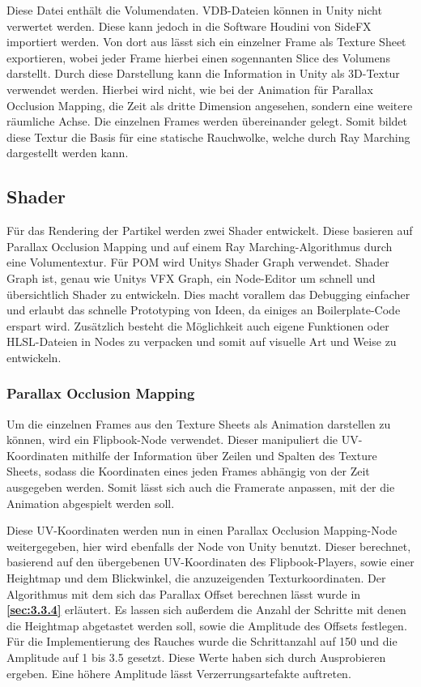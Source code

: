 Diese Datei enthält die Volumendaten. VDB-Dateien können in Unity nicht verwertet werden. Diese kann jedoch in die Software Houdini von SideFX importiert werden. 
Von dort aus lässt sich ein einzelner Frame als Texture Sheet exportieren, wobei jeder Frame hierbei einen sogennanten Slice des Volumens darstellt.
Durch diese Darstellung kann die Information in Unity als 3D-Textur verwendet werden.
Hierbei wird nicht, wie bei der Animation für Parallax Occlusion Mapping, die Zeit als dritte Dimension angesehen, sondern eine weitere räumliche Achse.
Die einzelnen Frames werden übereinander gelegt. Somit bildet diese Textur die Basis für eine statische Rauchwolke, welche durch Ray Marching dargestellt werden kann.



\subsection{Shader}
Für das Rendering der Partikel werden zwei Shader entwickelt. Diese basieren auf Parallax Occlusion Mapping und auf einem Ray Marching-Algorithmus
durch eine Volumentextur. Für POM wird Unitys Shader Graph verwendet. Shader Graph ist, genau wie Unitys VFX Graph, ein Node-Editor um
schnell und übersichtlich Shader zu entwickeln. Dies macht vorallem das Debugging einfacher und erlaubt das schnelle Prototyping von Ideen,
da einiges an Boilerplate-Code erspart wird. Zusätzlich besteht die Möglichkeit auch eigene Funktionen oder HLSL-Dateien in Nodes
zu verpacken und somit auf visuelle Art und Weise zu entwickeln.


\subsubsection{Parallax Occlusion Mapping}

Um die einzelnen Frames aus den Texture Sheets als Animation darstellen zu können, wird ein
Flipbook-Node\parencite{UnityDocs}
verwendet. Dieser manipuliert die UV-Koordinaten mithilfe der Information über Zeilen und Spalten des Texture Sheets,
sodass die Koordinaten eines jeden Frames abhängig von der Zeit ausgegeben werden.
Somit lässt sich auch die Framerate anpassen, mit der die Animation abgespielt werden soll.

Diese UV-Koordinaten werden nun in einen Parallax Occlusion Mapping-Node weitergegeben, hier wird ebenfalls der Node von
Unity benutzt. Dieser berechnet, basierend auf den übergebenen UV-Koordinaten des Flipbook-Players, sowie einer Heightmap und dem Blickwinkel, die anzuzeigenden Texturkoordinaten.
Der Algorithmus mit dem sich das Parallax Offset berechnen lässt wurde in \textbf{\autoref{sec:3.3.4}} erläutert.
Es lassen sich außerdem die Anzahl der Schritte mit denen die Heightmap abgetastet werden soll, sowie die Amplitude des Offsets festlegen.
Für die Implementierung des Rauches wurde die Schrittanzahl auf 150 und die Amplitude auf 1 bis 3.5 gesetzt. Diese Werte haben sich durch Ausprobieren ergeben.
Eine höhere Amplitude lässt Verzerrungsartefakte auftreten.


